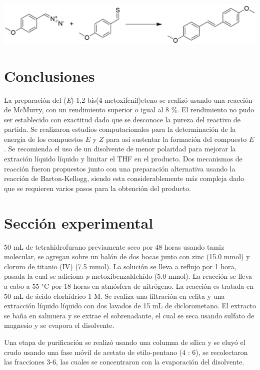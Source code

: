 \documentclass[fleqn,11pt]{SelfArx}
\begin{document}
\begin{scheme}[h]
	\centering
	\includegraphics[width=\linewidth]{structures/Barton.png}
	\caption{Obtenci\'on del (\textit{E})-1,2-bis(4-metoxifenil)eteno usando la reacci\'on de Barton-Kellogg.}
\end{scheme}

\section{Conclusiones}
La preparaci\'on del (\textit{E})-1,2-bis(4-metoxifenil)eteno se realiz\'o usando una reacci\'on de McMurry, con un rendimiento superior o igual al 8 \%. El rendimiento no pudo ser establecido con exactitud dado que se desconoce la pureza del reactivo de partida. Se realizaron estudios computacionales para la determinaci\'on de la energ\'ia de los compuestos $E$ y $Z$ para as\'i sustentar la formaci\'on del compuesto $E$. Se recomienda el uso de un disolvente de menor polaridad para mejorar la extraci\'on l\'iquido l\'iquido y limitar el THF en el producto. Dos mecanismos de reacci\'on fueron propuestos junto con una preparaci\'on alternativa usando la reacci\'on de Barton-Kellogg, siendo esta considerablemente m\'as compleja dado que se requieren varios pasos para la obtenci\'on del producto.

\section{Secci\'on experimental}
50 mL de tetrahidrofurano previamente seco por 48 horas usando tamiz molecular, se agregan sobre un bal\'on de dos bocas junto con zinc (15.0 mmol) y cloruro de titanio (IV) (7.5 mmol). La soluci\'on se lleva a reflujo por 1 hora, pasada la cual se adiciona \textit{p}-metoxibenzaldeh\'ido (5.0 mmol). La reacci\'on se lleva a cabo a 55 $^\circ$C por 18 horas en atm\'osfera de nitrógeno. La reacci\'on es tratada en 50 mL de \'acido clorh\'idrico 1 M. Se realiza una filtraci\'on en celita y una extracci\'on l\'iquido l\'iquido con dos lavados de 15 mL de diclorometano. El extracto se baña en salmuera y se extrae el sobrenadante, el cual se seca usando sulfato de magnesio y se evapora el disolvente.

Una etapa de purificaci\'on se realizó usando una columna de s\'ilica y se eluy\'o el crudo usando una fase m\'ovil de acetato de etilo-pentano (4 : 6), se recolectaron las fracciones 3-6, las cuales se concentraron con la evaporaci\'on del disolvente.
\end{document}
